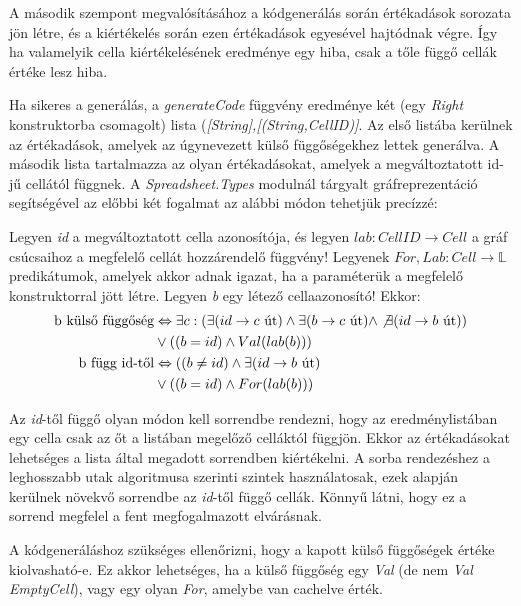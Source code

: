 A második szempont megvalósításához a kódgenerálás során értékadások sorozata jön létre, és a kiértékelés során ezen értékadások egyesével hajtódnak végre. Így ha valamelyik cella kiértékelésének eredménye egy hiba, csak a tőle függő cellák értéke lesz hiba. 

Ha sikeres a generálás, a \textit{generateCode} függvény eredménye két (egy \textit{Right} konstruktorba csomagolt) lista (\textit{[String],[(String,CellID)]}. Az első listába kerülnek az értékadások, amelyek az úgynevezett külső függőségekhez lettek generálva. A második lista tartalmazza az olyan értékadásokat, amelyek a megváltoztatott id-jű cellától függnek. A \textit{Spreadsheet.Types} modulnál tárgyalt gráfreprezentáció segítségével az előbbi két fogalmat az alábbi módon tehetjük precízzé: 

Legyen \textit{id} a megváltoztatott cella azonosítója, és legyen $lab : CellID \rightarrow Cell$ a gráf csúcsaihoz a megfelelő cellát hozzárendelő függvény! Legyenek $For,Lab : Cell \rightarrow \mathbb{L}$ predikátumok, amelyek akkor adnak igazat, ha a paraméterük a megfelelő konstruktorral jött létre. Legyen \textit{b} egy létező cellaazonosító! Ekkor:
\begin{align*}
	\text{b külső függőség} &\Leftrightarrow \exists c: (\exists (id \rightarrow c \text{ út}) \wedge \exists (b \rightarrow c \text{ út}) \wedge \not\exists  (id \rightarrow b \text{ út})) \\
	& \vee((b=id) \wedge Val(lab(b))) \\
	\text{b függ id-től} &\Leftrightarrow ((b \not= id) \wedge \exists (id \rightarrow b \text{ út}) \\
	&\vee ((b = id) \wedge For(lab(b)))
\end{align*}

Az \textit{id}-től függő olyan módon kell sorrendbe rendezni, hogy az eredménylistában egy cella csak az őt a listában megelőző celláktól függjön. Ekkor az értékadásokat lehetséges a lista által megadott sorrendben kiértékelni. A sorba rendezéshez a leghosszabb utak algoritmusa szerinti szintek használatosak, ezek alapján kerülnek növekvő sorrendbe az \textit{id}-től függő cellák. Könnyű látni, hogy ez a sorrend megfelel a fent megfogalmazott elvárásnak.  

A kódgeneráláshoz szükséges ellenőrizni, hogy a kapott külső függőségek értéke kiolvasható-e. Ez akkor lehetséges, ha a külső függőség egy \textit{Val} (de nem \textit{Val EmptyCell}), vagy egy olyan \textit{For}, amelybe van cachelve érték.

